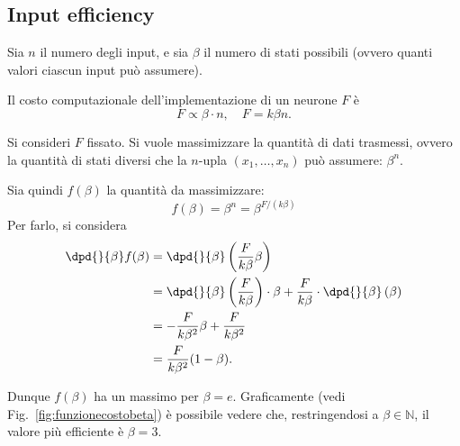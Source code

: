 \documentclass[10pt]{book}
\newcommand{\1}{\mathds{1}}
\newcommand{\N}{\mathds{N}}
\let\ln\relax
\DeclareMathOperator{\ln}{ln}
\theoremstyle{definition}%
\theoremstyle{plain}
\theoremstyle{remark}
\begin{document}
\subsection{Input efficiency}
\label{sec:orgd535427}

Sia \(n\) il numero degli input, e sia \(\beta\) il numero di stati possibili (ovvero quanti valori ciascun input può assumere).

Il costo computazionale dell'implementazione di un neurone \(F\) è
\begin{equation*}
F\propto \beta\cdot n, \quad F=k\beta n.
\end{equation*}

Si consideri \(F\) fissato. Si vuole massimizzare la quantità di dati trasmessi, ovvero la quantità di stati diversi che la \(n\)-upla \((x_{1},\dots,x_{n})\) può assumere: \(\beta^{n}\).

Sia quindi \(f(\beta)\) la quantità da massimizzare:
\begin{equation*}
f(\beta) = \beta^{n} = \beta^{F/(k\beta)}
\end{equation*}
Per farlo, si considera
\begin{align*}
\dpd{}{\beta} \ln f(\beta) &= \dpd{}{\beta} \left(\frac{F}{k\beta}\ln\beta\right)\\
&= \dpd{}{\beta} \left(\frac{F}{k\beta}\right)\cdot\ln\beta + \frac{F}{k\beta}\cdot\dpd{}{\beta} \left(\ln\beta\right)\\
&= -\frac{F}{k\beta^{2}}\ln\beta + \frac{F}{k\beta^{2}}\\
&= \frac{F}{k\beta^{2}} (1-\ln\beta).
\end{align*}

Dunque \(f(\beta)\) ha un massimo per \(\beta=e\). Graficamente (vedi Fig.~\ref{fig:funzionecostobeta}) è possibile vedere che, restringendosi a \(\beta \in \N\), il valore più efficiente è \(\beta=3\).
\end{document}
